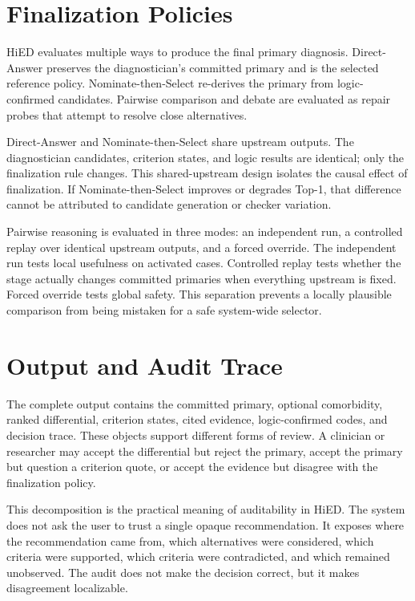 \section{Finalization Policies}

HiED evaluates multiple ways to produce the final primary diagnosis. Direct-Answer preserves the diagnostician's committed primary and is the selected reference policy. Nominate-then-Select re-derives the primary from logic-confirmed candidates. Pairwise comparison and debate are evaluated as repair probes that attempt to resolve close alternatives.

Direct-Answer and Nominate-then-Select share upstream outputs. The diagnostician candidates, criterion states, and logic results are identical; only the finalization rule changes. This shared-upstream design isolates the causal effect of finalization. If Nominate-then-Select improves or degrades Top-1, that difference cannot be attributed to candidate generation or checker variation.

Pairwise reasoning is evaluated in three modes: an independent run, a controlled replay over identical upstream outputs, and a forced override. The independent run tests local usefulness on activated cases. Controlled replay tests whether the stage actually changes committed primaries when everything upstream is fixed. Forced override tests global safety. This separation prevents a locally plausible comparison from being mistaken for a safe system-wide selector.

\section{Output and Audit Trace}

The complete output contains the committed primary, optional comorbidity, ranked differential, criterion states, cited evidence, logic-confirmed codes, and decision trace. These objects support different forms of review. A clinician or researcher may accept the differential but reject the primary, accept the primary but question a criterion quote, or accept the evidence but disagree with the finalization policy.

This decomposition is the practical meaning of auditability in HiED. The system does not ask the user to trust a single opaque recommendation. It exposes where the recommendation came from, which alternatives were considered, which criteria were supported, which criteria were contradicted, and which remained unobserved. The audit does not make the decision correct, but it makes disagreement localizable.

